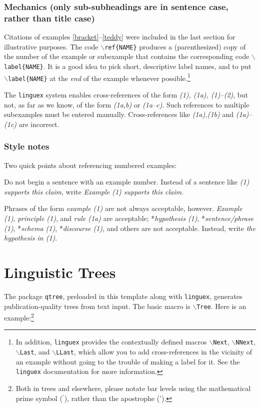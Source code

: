 \documentclass[letterpaper,12pt, twoside]{article}
\begin{document}
\subsubsection{Mechanics (only sub-subheadings are in sentence case, rather than title case)}\label{crossmech}
Citations of  examples \ref{bracket}--\ref{teddy} were included in the last section for illustrative purposes. The code \texttt{$\backslash$ref\{NAME\}} produces a (parenthesized) copy of the number of the example or subexample that contains the corresponding code \texttt{$\backslash$label\{NAME\}}. It is a good idea to pick short, descriptive label names, and to put \texttt{$\backslash$label\{NAME\}} at the \emph{end} of the example whenever possible.\footnote{In addition, \texttt{linguex} provides the contextually defined macros \texttt{$\backslash$Next}, \texttt{$\backslash$NNext}, \texttt{$\backslash$Last}, and \texttt{$\backslash$LLast}, which allow you to add cross-references in the vicinity of an example without going to the trouble of making a label for it. See the \texttt{linguex} documentation for more information.}

The \texttt{linguex} system enables cross-references of the form \emph{(1), (1a), (1)--(2)}, but not, as far as we know, of the form \emph{(1a,b)} or \emph{(1a--c)}. Such references to multiple subexamples must be entered manually. Cross-references like \emph{(1a),(1b)} and \emph{(1a)--(1c)} are incorrect.


\subsubsection{Style notes}\label{crosssty}

Two quick points about referencing numbered examples:

Do not begin a sentence with an example number. Instead of a sentence like \emph{(1) supports this claim}, write \emph{Example (1) supports this claim}.

Phrases of the form \emph{example (1)} are not always acceptable, however. \emph{Example (1)}, \emph{principle (1)}, and \emph{rule (1a)} are acceptable; *\emph{hypothesis (1)}, *\emph{sentence/phrase (1)}, *\emph{schema (1)}, *\emph{discourse (1)}, and others are not acceptable. Instead, write \emph{the hypothesis in (1)}.





\section{Linguistic Trees}\label{sectrees}
The package \texttt{qtree}, preloaded in this template along with \texttt{linguex}, generates publication-quality trees from text input. The basic macro is \texttt{$\backslash$Tree}. Here is an example:\footnote{Both in trees and elsewhere, please notate bar levels using the mathematical prime symbol ($^\prime$), rather than the apostrophe (').\label{noteprime}}
\end{document}
